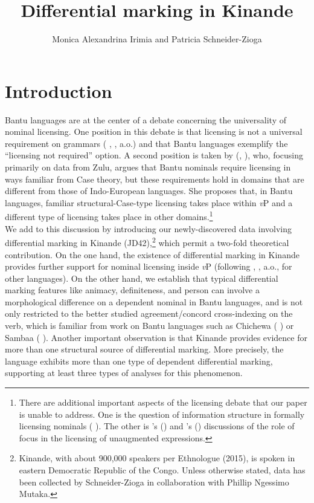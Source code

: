 \documentclass[output=paper]{langscibook}
\author{Monica Alexandrina Irimia \affiliation{University of Modena and Reggio Emilia} and Patricia Schneider-Zioga \affiliation{University of California, Fullerton}}
\title{Differential marking in Kinande}
\begin{document}
\maketitle

\section{Introduction}\label{sec:schneider:section1Intro}\largerpage[.525]

Bantu languages are at the center of a debate concerning the universality of nominal licensing. One position in this debate is that licensing is not a universal requirement on grammars (\citeauthor{HarfordPerez1985} \citeyear{HarfordPerez1985}, \citeauthor{Diercks2012parameterizing} \citeyear{Diercks2012parameterizing}, a.o.) and that Bantu languages exemplify the ``licensing not required'' option. A second position is taken by \citeauthor{Halpert2013} (\citeyear{Halpert2013}, \citeyear{Halpert2015}), who, focusing primarily on data from Zulu, argues that Bantu nominals require licensing in ways familiar from Case theory, but these requirements hold in domains that are different from those of Indo-European languages. She proposes that, in Bantu languages, familiar structural-Case-type licensing takes place within \textit{v}P and a different type of licensing takes place in other domains.\footnote{There are additional important aspects of the licensing debate that our paper is unable to address. One is the question of information structure in formally licensing nominals (\citeauthor{vanderWal2017} \citeyear{vanderWal2017}). The other is \citeauthor{CarstensMletshe2016}'s (\citeyear{CarstensMletshe2016}) and \citeauthor{Pietraszko2019}'s (\citeyear{Pietraszko2019}) discussions of the role of focus in the licensing of unaugmented expressions. }\\
\indent We add to this discussion by introducing our newly-discovered data involving differential marking in Kinande (JD42),\footnote{Kinande, with about 900,000 speakers per Ethnologue (2015), is spoken in eastern Democratic Republic of the Congo. Unless otherwise stated, data has been collected by Schneider-Zioga in collaboration with Phillip Ngessimo Mutaka.} which permit a two-fold theoretical contribution. On the one hand, the existence of differential marking in Kinande provides further support for nominal licensing inside \textit{v}P (following \citeauthor{OrmazabalRomero2013} \citeyear{OrmazabalRomero2013},  \citeauthor{Kalin2018} \citeyear{Kalin2018}, a.o., for other languages). On the other hand, we establish that typical differential marking features like animacy, definiteness, and person can involve a morphological difference on a dependent nominal in Bantu languages, and is not only restricted to the better studied agreement/concord cross-indexing on the verb, which is familiar from work on Bantu languages such as Chichewa (\citeauthor{BresnanMchombo1987} \citeyear{BresnanMchombo1987}) or Sambaa (\citeauthor{Riedel2009} \citeyear{Riedel2009}). Another important observation is that Kinande provides evidence for more than one structural source of differential marking. More precisely, the language exhibits more than one type of dependent differential marking, supporting at least three types of analyses for this phenomenon. 
\end{document}
